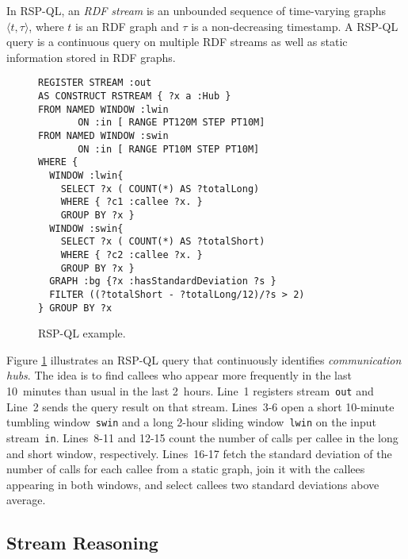 In RSP-QL, an \textit{RDF stream} is an unbounded sequence of
time-varying graphs $\langle t,\tau\rangle$, where $t$ is an RDF graph
and $\tau$ is a non-decreasing timestamp.  A RSP-QL query is a
continuous query on multiple RDF streams as well as static information
stored in RDF graphs.  

\begin{figure}[!h]
\begin{lstlisting}[language=rsp-ql]
REGISTER STREAM :out
AS CONSTRUCT RSTREAM { ?x a :Hub }
FROM NAMED WINDOW :lwin
       ON :in [ RANGE PT120M STEP PT10M]
FROM NAMED WINDOW :swin
       ON :in [ RANGE PT10M STEP PT10M]
WHERE {
  WINDOW :lwin{
    SELECT ?x ( COUNT(*) AS ?totalLong)
    WHERE { ?c1 :callee ?x. }
    GROUP BY ?x }
  WINDOW :swin{
    SELECT ?x ( COUNT(*) AS ?totalShort)
    WHERE { ?c2 :callee ?x. }
    GROUP BY ?x }
  GRAPH :bg {?x :hasStandardDeviation ?s }
  FILTER ((?totalShort - ?totalLong/12)/?s > 2)
} GROUP BY ?x
\end{lstlisting}
\vspace*{-4mm}
\caption{\label{fig:rspql}RSP-QL example.}
\end{figure}

Figure \ref{fig:rspql} illustrates an RSP-QL query that continuously
identifies \textit{communication hubs}. The idea is to find callees
who appear more frequently in the last 10~minutes than usual in the
last 2~hours. Line~1 registers stream~\lstinline{out} and Line~2 sends
the query result on that stream. \mbox{Lines 3-6} open a short
10-mi\-nute tumbling window~\lstinline{swin} and a long \mbox{2-hour}
sliding window~\lstinline{lwin} on the input
stream~\lstinline{in}. \mbox{Lines 8-11} and \mbox{12-15} count the
number of calls per callee in the long and short window,
respectively. \mbox{Lines 16-17} fetch the standard deviation of the
number of calls for each callee from a static graph, join it with the
callees appearing in both windows, and select callees two
standard deviations above average.

\subsection{Stream Reasoning}\label{sec:sr} %

